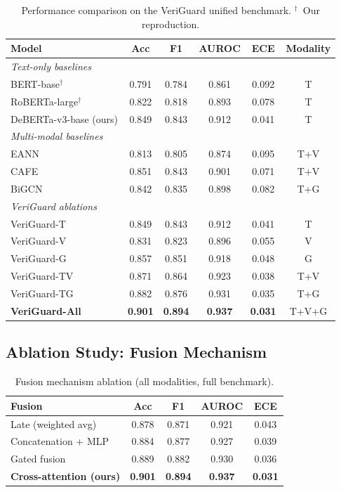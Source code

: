\documentclass[11pt,a4paper]{article}
\begin{document}
\begin{table}[h]
\centering
\caption{Performance comparison on the VeriGuard unified benchmark.
$^\dagger$~Our reproduction.}
\label{tab:results}
\begin{tabular}{lccccc}
\toprule
\textbf{Model} & \textbf{Acc} & \textbf{F1} & \textbf{AUROC} & \textbf{ECE} & \textbf{Modality} \\
\midrule
\multicolumn{6}{l}{\textit{Text-only baselines}} \\
BERT-base$^\dagger$ & 0.791 & 0.784 & 0.861 & 0.092 & T \\
RoBERTa-large$^\dagger$ & 0.822 & 0.818 & 0.893 & 0.078 & T \\
DeBERTa-v3-base (ours) & 0.849 & 0.843 & 0.912 & 0.041 & T \\
\midrule
\multicolumn{6}{l}{\textit{Multi-modal baselines}} \\
EANN~\cite{wang2018eann} & 0.813 & 0.805 & 0.874 & 0.095 & T+V \\
CAFE~\cite{chen2022cafe} & 0.851 & 0.843 & 0.901 & 0.071 & T+V \\
BiGCN~\cite{bian2020rumor} & 0.842 & 0.835 & 0.898 & 0.082 & T+G \\
\midrule
\multicolumn{6}{l}{\textit{VeriGuard ablations}} \\
VeriGuard-T & 0.849 & 0.843 & 0.912 & 0.041 & T \\
VeriGuard-V & 0.831 & 0.823 & 0.896 & 0.055 & V \\
VeriGuard-G & 0.857 & 0.851 & 0.918 & 0.048 & G \\
VeriGuard-TV & 0.871 & 0.864 & 0.923 & 0.038 & T+V \\
VeriGuard-TG & 0.882 & 0.876 & 0.931 & 0.035 & T+G \\
\textbf{VeriGuard-All} & \textbf{0.901} & \textbf{0.894} & \textbf{0.937} & \textbf{0.031} & T+V+G \\
\bottomrule
\end{tabular}
\end{table}

\subsection{Ablation Study: Fusion Mechanism}

\begin{table}[h]
\centering
\caption{Fusion mechanism ablation (all modalities, full benchmark).}
\label{tab:fusion_ablation}
\begin{tabular}{lcccc}
\toprule
\textbf{Fusion} & \textbf{Acc} & \textbf{F1} & \textbf{AUROC} & \textbf{ECE} \\
\midrule
Late (weighted avg) & 0.878 & 0.871 & 0.921 & 0.043 \\
Concatenation + MLP & 0.884 & 0.877 & 0.927 & 0.039 \\
Gated fusion & 0.889 & 0.882 & 0.930 & 0.036 \\
\textbf{Cross-attention (ours)} & \textbf{0.901} & \textbf{0.894} & \textbf{0.937} & \textbf{0.031} \\
\bottomrule
\end{tabular}
\end{table}
\end{document}
